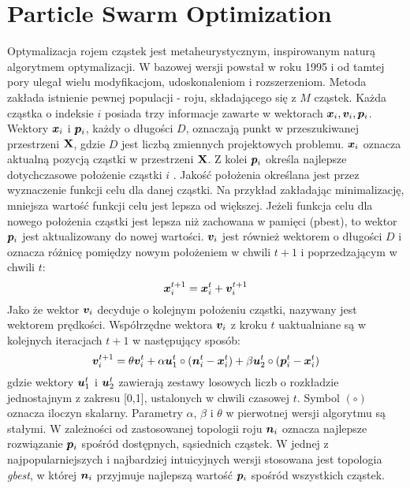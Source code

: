 \section{Particle Swarm Optimization} \label{sect:pso_def}
Optymalizacja rojem cząstek  jest metaheurystycznym, inspirowanym naturą algorytmem optymalizacji. W bazowej wersji powstał w roku 1995 \parencite{Kennedy1995a,Eberhart1995} i od tamtej pory ulegał wielu modyfikacjom, udoskonaleniom i rozszerzeniom. Metoda zakłada istnienie pewnej populacji - roju, składającego się z $M$ cząstek. Każda cząstka o indeksie $i$ posiada trzy informacje zawarte w wektorach $\bm{x}_i,\bm{v}_i,\bm{p}_i$. Wektory $\bm{x}_i$ i $\bm{p}_i$, każdy o długości $D$, oznaczają punkt w przeszukiwanej przestrzeni $\mathbf{X}$, gdzie $D$ jest liczbą zmiennych projektowych problemu. $\bm{x}_i$ oznacza aktualną pozycją cząstki w przestrzeni $\mathbf{X}$. Z kolei $\bm{p}_i$ określa najlepsze dotychczasowe położenie cząstki $i$ . Jakość położenia określana jest przez wyznaczenie funkcji celu dla danej cząstki. Na przykład zakładając minimalizację, mniejsza wartość funkcji celu jest lepsza od większej. Jeżeli funkcja celu dla nowego położenia cząstki jest lepsza niż zachowana w pamięci (pbest), to wektor $\bm{p}_i$ jest aktualizowany do nowej wartości. $\bm{v}_i$ jest również wektorem o długości $D$ i oznacza różnicę pomiędzy nowym położeniem w chwili $t+1$ i poprzedzającym w chwili $t$:
\begin{equation} \label{eq: pso_position}
	\bm{x}_i^{t+1}=\bm{x}_i^t+\bm{v}_i^{t+1}
\end{equation}
 Jako że wektor $\bm{v}_i$ decyduje o kolejnym położeniu cząstki, nazywany jest wektorem prędkości. Współrzędne wektora $\bm{v}_i$ z kroku $t$ uaktualniane są w kolejnych iteracjach $t+1$ w następujący sposób:
\begin{equation} \label{eq: pso_velocity}
	\bm{v}_{i}^{t+1}=\theta\bm{v}_i^t+\alpha\bm{u}_1^t\circ (\bm{n}_i^t-\bm{x}_i^t)+\beta\bm{u}_2^t\circ(\bm{p}_i^t-\bm{x}_i^t)
\end{equation}
gdzie wektory $\bm{u}_1^t$ i $\bm{u}_2^t$ zawierają zestawy losowych liczb o rozkładzie jednostajnym z zakresu [0,1], ustalonych w chwili czasowej $t$. Symbol $(\circ)$ oznacza iloczyn skalarny. Parametry $\alpha$, $\beta$ i $\theta$ w pierwotnej wersji algorytmu są stałymi. W zależności od zastosowanej topologii roju $\bm{n}_i$ oznacza najlepsze rozwiązanie $\bm{p}_i$ spośród dostępnych, sąsiednich cząstek. W jednej z najpopularniejszych i najbardziej intuicyjnych wersji stosowana jest topologia \textit{gbest}, w której $\bm{n}_i$ przyjmuje najlepszą wartość $\bm{p}_i$ spośród wszystkich cząstek.
